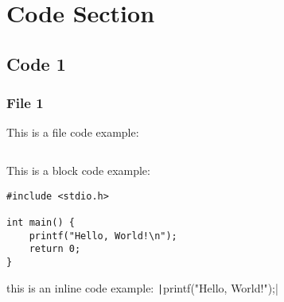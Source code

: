 \chapter{Code Section}\label{Code_Section}

\section{Code 1}\label{Code_1}
	\subsection{File 1}
	This is a file code example:
	\inputminted[breaklines]{c}{./appendices/files/example.c}
	
	This is a block code example:

	\begin{verbatim}
#include <stdio.h>

int main() {
	printf("Hello, World!\n");
	return 0;
}
	\end{verbatim}

this is an inline code example: \texttt|printf("Hello, World!\n");|